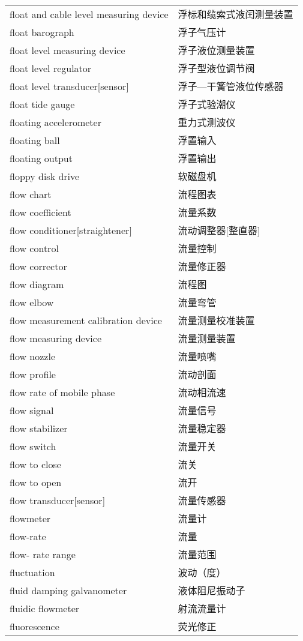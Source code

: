 \documentclass[
]{article}
\begin{document}
\begin{longtable}[]{@{}ll@{}}
float and cable level measuring device & 浮标和缆索式液闰测量装置 \\
float barograph & 浮子气压计 \\
float level measuring device & 浮子液位测量装置 \\
float level regulator & 浮子型液位调节阀 \\
float level transducer{[}sensor{]} & 浮子---干簧管液位传感器 \\
float tide gauge & 浮子式验潮仪 \\
floating accelerometer & 重力式测波仪 \\
floating ball & 浮置输入 \\
floating output & 浮置输出 \\
floppy disk drive & 软磁盘机 \\
flow chart & 流程图表 \\
flow coefficient & 流量系数 \\
flow conditioner{[}straightener{]} & 流动调整器{[}整直器{]} \\
flow control & 流量控制 \\
flow corrector & 流量修正器 \\
flow diagram & 流程图 \\
flow elbow & 流量弯管 \\
flow measurement calibration device & 流量测量校准装置 \\
flow measuring device & 流量测量装置 \\
flow nozzle & 流量喷嘴 \\
flow profile & 流动剖面 \\
flow rate of mobile phase & 流动相流速 \\
flow signal & 流量信号 \\
flow stabilizer & 流量稳定器 \\
flow switch & 流量开关 \\
flow to close & 流关 \\
flow to open & 流开 \\
flow transducer{[}sensor{]} & 流量传感器 \\
flowmeter & 流量计 \\
flow-rate & 流量 \\
flow- rate range & 流量范围 \\
fluctuation & 波动（度） \\
fluid damping galvanometer & 液体阻尼振动子 \\
fluidic flowmeter & 射流流量计 \\
fluorescence & 荧光修正 \\

\end{longtable}
\end{document}
